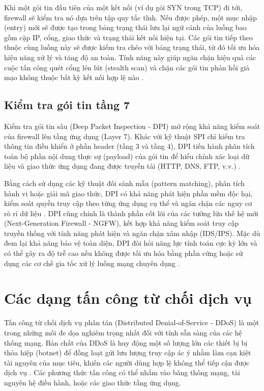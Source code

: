 \documentclass[../DoAn.tex]{subfiles}
\begin{document}
Khi một gói tin đầu tiên của một kết nối (ví dụ gói SYN trong TCP) đi tới, firewall sẽ kiểm tra nó dựa trên tập quy tắc tĩnh. Nếu được phép, một mục nhập (entry) mới sẽ được tạo trong bảng trạng thái lưu lại ngữ cảnh của luồng bao gồm cặp IP, cổng, giao thức và trạng thái kết nối hiện tại. Các gói tin tiếp theo thuộc cùng luồng này sẽ được kiểm tra chéo với bảng trạng thái, từ đó tối ưu hóa hiệu năng xử lý và tăng độ an toàn. Tính năng này giúp ngăn chặn hiệu quả các cuộc tấn công quét cổng lén lút (stealth scan) và chặn các gói tin phản hồi giả mạo không thuộc bất kỳ kết nối hợp lệ nào \cite{kurose2017computer}.

\subsection{Kiểm tra gói tin tầng 7}
Kiểm tra gói tin sâu (Deep Packet Inspection - DPI) mở rộng khả năng kiểm soát của firewall lên tầng ứng dụng (Layer 7). Khác với kỹ thuật SPI chỉ kiểm tra thông tin điều khiển ở phần header (tầng 3 và tầng 4), DPI tiến hành phân tích toàn bộ phần nội dung thực sự (payload) của gói tin để hiểu chính xác loại dữ liệu và giao thức ứng dụng đang được truyền tải (HTTP, DNS, FTP, v.v.) \cite{scarfone2009guidelines}.

Bằng cách sử dụng các kỹ thuật đối sánh mẫu (pattern matching), phân tích hành vi hoặc giải mã giao thức, DPI có khả năng phát hiện phần mềm độc hại, kiểm soát quyền truy cập theo từng ứng dụng cụ thể và ngăn chặn các nguy cơ rò rỉ dữ liệu \cite{scarfone2009guidelines}. DPI cũng chính là thành phần cốt lõi của các tường lửa thế hệ mới (Next-Generation Firewall - NGFW), kết hợp khả năng kiểm soát truy cập truyền thống với tính năng phát hiện và ngăn chặn xâm nhập (IDS/IPS). Mặc dù đem lại khả năng bảo vệ toàn diện, DPI đòi hỏi năng lực tính toán cực kỳ lớn và có thể gây ra độ trễ cao nếu không được tối ưu hóa bằng phần cứng hoặc sử dụng các cơ chế gia tốc xử lý luồng mạng chuyên dụng \cite{cheswick2003firewalls, kurose2017computer}.

\section{Các dạng tấn công từ chối dịch vụ}
Tấn công từ chối dịch vụ phân tán (Distributed Denial-of-Service - DDoS) là một trong những mối đe dọa nghiêm trọng nhất đối với tính sẵn sàng của các hệ thống mạng. Bản chất của DDoS là huy động một số lượng lớn các thiết bị bị thỏa hiệp (botnet) để đồng loạt gửi lưu lượng truy cập ác ý nhằm làm cạn kiệt tài nguyên của mục tiêu, khiến các người dùng hợp lệ không thể tiếp cận được dịch vụ \cite{mirkovic2004taxonomy}. Các phương thức tấn công có thể nhắm vào băng thông mạng, tài nguyên hệ điều hành, hoặc các giao thức tầng ứng dụng.
\end{document}
